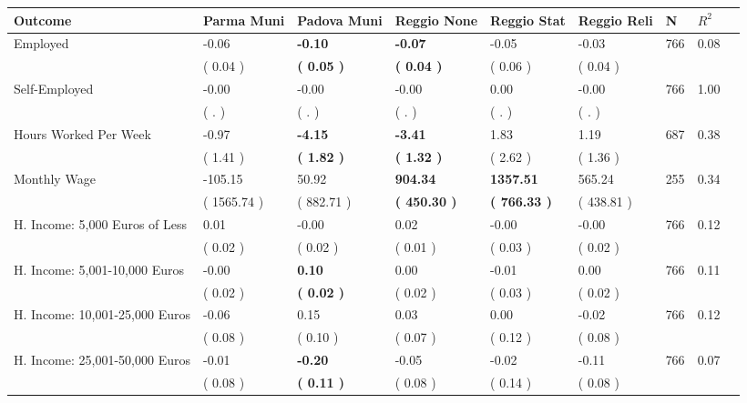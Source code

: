 \begin{tabular}{L{6.2cm} C{1.8cm} C{1.8cm} C{1.8cm} C{1.8cm} C{1.8cm} C{1.8cm} C{0.3cm} C{0.3cm}}
\toprule
 \textbf{Outcome} & \textbf{Parma Muni} & \textbf{Padova Muni} & \textbf{Reggio None} & \textbf{Reggio Stat} & \textbf{Reggio Reli} & \textbf{N} & \textbf{$ R^2$} \\
\midrule
Employed &     -0.06 & \textbf{    -0.10} & \textbf{    -0.07} &     -0.05 &     -0.03  & 766 &       0.08 \\ 
 & (     0.04 ) & \textbf{(     0.05 )} & \textbf{(     0.04 )} & (     0.06 ) & (     0.04 )  & \\
Self-Employed &     -0.00 &     -0.00 &     -0.00 &      0.00 &     -0.00  & 766 &       1.00 \\ 
 & (        . ) & (        . ) & (        . ) & (        . ) & (        . )  & \\
Hours Worked Per Week &     -0.97 & \textbf{    -4.15} & \textbf{    -3.41} &      1.83 &      1.19  & 687 &       0.38 \\ 
 & (     1.41 ) & \textbf{(     1.82 )} & \textbf{(     1.32 )} & (     2.62 ) & (     1.36 )  & \\
Monthly Wage &   -105.15 &     50.92 & \textbf{   904.34} & \textbf{  1357.51} &    565.24  & 255 &       0.34 \\ 
 & (  1565.74 ) & (   882.71 ) & \textbf{(   450.30 )} & \textbf{(   766.33 )} & (   438.81 )  & \\
H. Income: 5,000 Euros of Less &      0.01 &     -0.00 &      0.02 &     -0.00 &     -0.00  & 766 &       0.12 \\ 
 & (     0.02 ) & (     0.02 ) & (     0.01 ) & (     0.03 ) & (     0.02 )  & \\
H. Income: 5,001-10,000 Euros &     -0.00 & \textbf{     0.10} &      0.00 &     -0.01 &      0.00  & 766 &       0.11 \\ 
 & (     0.02 ) & \textbf{(     0.02 )} & (     0.02 ) & (     0.03 ) & (     0.02 )  & \\
H. Income: 10,001-25,000 Euros &     -0.06 &      0.15 &      0.03 &      0.00 &     -0.02  & 766 &       0.12 \\ 
 & (     0.08 ) & (     0.10 ) & (     0.07 ) & (     0.12 ) & (     0.08 )  & \\
H. Income: 25,001-50,000 Euros &     -0.01 & \textbf{    -0.20} &     -0.05 &     -0.02 &     -0.11  & 766 &       0.07 \\ 
 & (     0.08 ) & \textbf{(     0.11 )} & (     0.08 ) & (     0.14 ) & (     0.08 )  & \\

\end{tabular}
